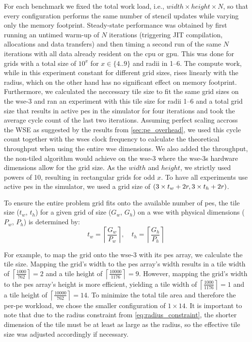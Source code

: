 For each benchmark we fixed the total work load, i.e., $width\times height\times N$, so that every configuration performs the same number of stencil updates while varying only the memory footprint. Steady-state performance was obtained by first running an untimed warm-up of $N$ iterations (triggering JIT compilation, allocations and data transfers) and then timing a second run of the same $N$ iterations with all data already resident on the \ac{cpu} or \ac{gpu}. This was done for grids with a total size of $10^x$ for $x \in \{4..9\}$ and radii in \numrange{1}{6}.
The compute work, while in this experiment constant for different grid sizes, rises linearly with the radius, which on the other hand has no significant effect on memory footprint.
Furthermore, we calculated the neccessary tile size to fit the same grid sizes on the \ac{wse}-3 and ran an experiment with this tile size for radii \numrange{1}{6} and a total grid size that results in  active \acp{pe} in the simulator for four iterations and took the average cycle count of the last two iterations.
Assuming perfect scaling accross the WSE as suggested by the results from \autoref{sec:pe_overhead}, we used this cycle count together with the \ac{wse}s clock frequency to calculate the theoretical throughput when using the entire \ac{wse} dimensions.
We also added the throughput, the non-tiled algorithm would achieve on the \ac{wse}-3 where the \ac{wse}-3s hardware dimensions allow for the grid size.
As the $width$ and $height$, we strictly used powers of 10, resulting in rectangular grids for odd $x$.
To have all experiments use  active \acp{pe} in the simulator, we used a grid size of $\left(3\times t_w + 2r, 3\times t_h + 2r \right)$.

To ensure the entire problem grid fits onto the available number of \acp{pe}, the tile size ($t_w$, $t_h$) for a given grid of size ($G_w$, $G_h$) on a \ac{wse} with physical dimensions ($P_w$, $P_h$) is determined by:
\begin{equation}
    t_w = \left\lceil \frac{G_w}{P_w} \right\rceil, \quad t_h = \left\lceil \frac{G_h}{P_h} \right\rceil
\end{equation}

For example, to map the  grid onto the \ac{wse}-3 with its  \acp{pe} array, we calculate the tile size. Mapping the grid's width to the \acp{pe} array's width results in a tile width of $\left\lceil \frac{1000}{762} \right\rceil = 2$ and a tile height of $\left\lceil \frac{10000}{1176} \right\rceil = 9$. However, mapping the grid's width to the \acp{pe} array's height is more efficient, yielding a tile width of $\left\lceil \frac{1000}{1176} \right\rceil = 1$ and a tile height of $\left\lceil \frac{10000}{762} \right\rceil = 14$. To minimize the total tile area and therefore the per-\ac{pe} workload, we chose the smaller configuration of $1 \times 14$. It is important to note that due to the radius constraint from \autoref{eq:radius_constraint}, the shorter dimension of the tile must be at least as large as the radius, so the effective tile size was adjusted accordingly if necessary.

